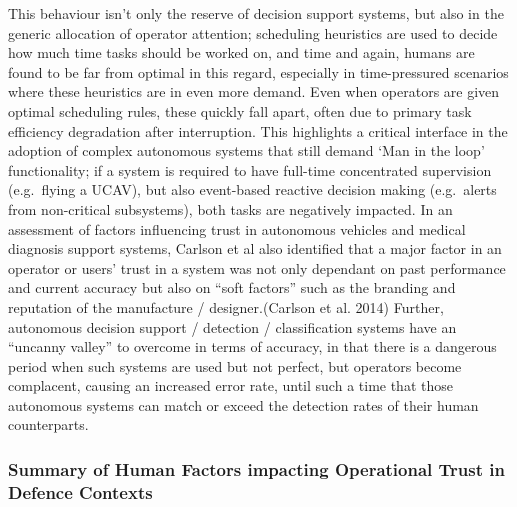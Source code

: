  This behaviour isn’t only the reserve of decision support systems, but also in the generic allocation of operator attention; scheduling heuristics are used to decide how much time tasks should be worked on, and time and again, humans are found to be far from optimal in this regard, especially in time-pressured scenarios where these heuristics are in even more demand.
 Even when operators are given optimal scheduling rules, these quickly fall apart, often due to primary task efficiency degradation after interruption.
 This highlights a critical interface in the adoption of complex autonomous systems that still demand ‘Man in the loop’ functionality; if a system is required to have full-time concentrated supervision (e.g.\ flying a UCAV), but also event-based reactive decision making (e.g.\ alerts from non-critical subsystems), both tasks are negatively impacted.
 In an assessment of factors influencing trust in autonomous vehicles and medical diagnosis support systems, Carlson et al also identified that a major factor in an operator or users’ trust in a system was not only dependant on past performance and current accuracy but also on ``soft factors'' such as the branding and reputation of the manufacture / designer.(Carlson et al. 2014)
 Further, autonomous decision support / detection / classification systems have an ``uncanny valley'' to overcome in terms of accuracy, in that there is a dangerous period when such systems are used but not perfect, but operators become complacent, causing an increased error rate, until such a time that those autonomous systems can match or exceed the detection rates of their human counterparts.
 
 \subsubsection{Summary of Human Factors impacting Operational Trust in Defence Contexts}
 
